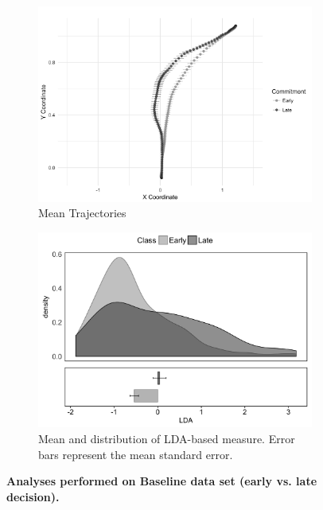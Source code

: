 \documentclass[11pt]{article}
\begin{document}
\begin{figure}
\centering
\begin{subfigure}[b]{0.45\textwidth}
\includegraphics[width=\textwidth]{TrajectoriesBaseline.png}
\caption{Mean Trajectories}\label{fig:baseline-traj}
\end{subfigure}
\begin{subfigure}[b]{0.45\textwidth}
\includegraphics[width=\textwidth]{LDA-baseline.png}
\caption{Mean and distribution of LDA-based measure. Error bars represent the mean standard error.}\label{fig:baseline-lda}
\end{subfigure}
\caption{\textbf{Analyses performed on Baseline data set (early vs. late decision).}}
\end{figure}
\end{document}
